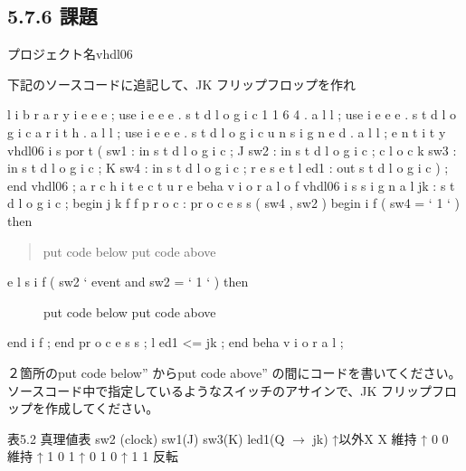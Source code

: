 \documentclass[letterpaper,10pt,dvipdfmx]{sphinxmanual}
\begin{document}
\subsection{5.7.6 課題}
\label{05_try:id13}
プロジェクト名vhdl06

下記のソースコードに追記して、JK フリップフロップを作れ

l i b r a r y i e e e ;
use i e e e . s t d l o g i c 1 1 6 4 . a l l ;
use i e e e . s t d l o g i c a r i t h . a l l ;
use i e e e . s t d l o g i c u n s i g n e d . a l l ;
e n t i t y vhdl06 i s
por t (
sw1 : in s t d l o g i c ;    J
sw2 : in s t d l o g i c ;    c l o c k
sw3 : in s t d l o g i c ;    K
sw4 : in s t d l o g i c ;    r e s e t
l ed1 : out s t d l o g i c
) ;
end vhdl06 ;
a r c h i t e c t u r e beha v i o r a l o f vhdl06 i s
s i g n a l jk : s t d l o g i c ;
begin
j k f f p r o c : pr o c e s s ( sw4 , sw2 )
begin
i f ( sw4 = ` 1 ` ) then
\begin{quote}

put code below
put code above
\end{quote}
\begin{description}
\item[{e l s i f ( sw2 ` event and sw2 = ` 1 ` ) then}] \leavevmode
put code below
put code above

\end{description}

end i f ;
end pr o c e s s ;
l ed1 \textless{}= jk ;
end beha v i o r a l ;

２箇所のput code below'' からput code above'' の間にコードを書いてください。
ソースコード中で指定しているようなスイッチのアサインで、JK フリップフロップを作成してください。

表5.2 真理値表
sw2 (clock) sw1(J) sw3(K) led1(Q \(\rightarrow\) jk)
↑以外X X 維持
↑ 0 0 維持
↑ 1 0 1
↑ 0 1 0
↑ 1 1 反転
\end{document}
